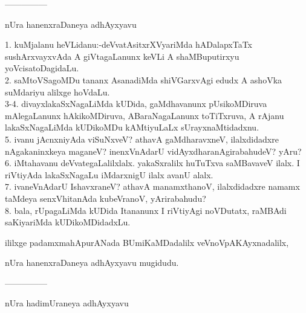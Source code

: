 \documentclass{article}
\begin{document}
\begin{center}
---------------
\end{center}

\begin{center}
nUra hanenxraDaneya adhAyxyavu
\end{center}

1. kuMjalanu heVLidanu:-deVvatAsitxrXVyariMda hADalapxTaTx sushArxvayxvAda A giVtagaLanunx keVLi A shaMBuputirxyu yoVcisatoDagidaLu.\\
2. saMtoVSagoMDu tananx AsanadiMda shiVGarxvAgi edudx A ashoVka suMdariyu alilxge hoVdaLu.\\
3-4. divayxlakaSxNagaLiMda kUDida, gaMdhavanunx pUsikoMDiruva mAlegaLanunx hAkikoMDiruva, ABaraNagaLanunx toTiTxruva, A rAjanu lakaSxNagaLiMda kUDikoMDu kAMtiyuLaLx sUrayxnaMtidadxnu.\\
5. ivanu jAcnxniyAda viSuNxveV? athavA gaMdharavxneV, ilalxdidadxre nAgakaninxkeya maganeV? inenxVnAdarU vidAyxdharanAgirabahudeV? yAru?\\
6. iMtahavanu deVvategaLalilxlalx. yakaSxralilx huTuTxva saMBavaveV ilalx. I riVtiyAda lakaSxNagaLu iMdarxnigU ilalx avanU alalx.\\
7. ivaneVnAdarU IshavxraneV? athavA manamxthanoV, ilalxdidadxre namamx taMdeya senxVhitanAda kubeVranoV, yArirabahudu?\\
8. bala, rUpagaLiMda kUDida Itananunx I riVtiyAgi noVDutatx, raMBAdi saKiyariMda kUDikoMDidadxLu.

\begin{center}
ililxge padamxmahApurANada BUmiKaMDadalilx veVnoVpAKAyxnadalilx,
\end{center}

\begin{center}
nUra hanenxraDaneya adhAyxyavu mugidudu.
\end{center}

\begin{center}
---------------
\end{center}

\begin{center}
nUra hadimUraneya adhAyxyavu
\end{center}
\end{document}
